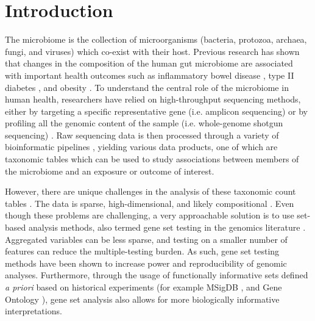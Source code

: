 \section{Introduction} \label{introduction}
The microbiome is the collection of microorganisms (bacteria, protozoa, archaea, fungi, and viruses) which co-exist with their host. Previous research has shown that changes in the composition of the human gut microbiome are associated with important health outcomes such as inflammatory bowel disease \cite{proctor2019}, type II diabetes \cite{sharma2019a}, and obesity \cite{aoun2020}. To understand the central role of the microbiome in human health, researchers have relied on high-throughput sequencing methods, either by targeting a specific representative gene (i.e. amplicon sequencing) or by profiling all the genomic content of the sample (i.e. whole-genome shotgun sequencing) \cite{cho2012}. Raw sequencing data is then processed through a variety of bioinformatic pipelines \cite{callahan2016, truong2015}, yielding various data products, one of which are taxonomic tables which can be used to study associations between members of the microbiome and an exposure or outcome of interest. 

However, there are unique challenges in the analysis of these taxonomic count tables \cite{li2019a,li2015}. The data is sparse, high-dimensional, and likely compositional \cite{gloor2017, li2019a, li2015}. Even though these problems are challenging, a very approachable solution is to use set-based analysis methods, also termed gene set testing in the genomics literature \cite{khatri2012, goeman2007}. Aggregated variables can be less sparse, and testing on a smaller number of features can reduce the multiple-testing burden. As such, gene set testing methods have been shown to increase power and reproducibility of genomic analyses. Furthermore, through the usage of functionally informative sets defined \emph{a priori} based on historical experiments (for example MSigDB \cite{subramanian2005}, and Gene Ontology \cite{ashburner2000}), gene set analysis also allows for more biologically informative interpretations. 

